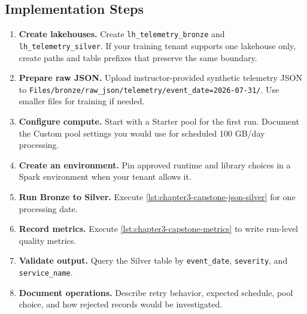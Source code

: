 \subsection*{Implementation Steps}
\begin{enumerate}
    \item \textbf{Create lakehouses.} Create \texttt{lh\_telemetry\_bronze} and \texttt{lh\_telemetry\_silver}. If your training tenant supports one lakehouse only, create paths and table prefixes that preserve the same boundary.
    \item \textbf{Prepare raw JSON.} Upload instructor-provided synthetic telemetry JSON to \texttt{Files/bronze/raw\_json/telemetry/event\_date=2026-07-31/}. Use smaller files for training if needed.
    \item \textbf{Configure compute.} Start with a Starter pool for the first run. Document the Custom pool settings you would use for scheduled 100 GB/day processing.
    \item \textbf{Create an environment.} Pin approved runtime and library choices in a Spark environment when your tenant allows it.
    \item \textbf{Run Bronze to Silver.} Execute \cref{lst:chapter3-capstone-json-silver} for one processing date.
    \item \textbf{Record metrics.} Execute \cref{lst:chapter3-capstone-metrics} to write run-level quality metrics.
    \item \textbf{Validate output.} Query the Silver table by \texttt{event\_date}, \texttt{severity}, and \texttt{service\_name}.
    \item \textbf{Document operations.} Describe retry behavior, expected schedule, pool choice, and how rejected records would be investigated.
\end{enumerate}

